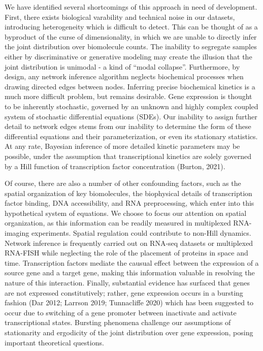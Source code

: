 \documentclass{article}
\begin{document}
We have identified several shortcomings of this approach in need of development. First, there exists biological varability and technical noise in our datasets, introducing heterogeneity which is difficult to detect. This can be thought of as a byproduct of the curse of dimensionality, in which we are unable to directly infer the joint distribution over biomolecule counts. The inability to segregate samples either by discriminative or generative modeling may create the illusion that the joint distribution is unimodal - a kind of ``modal collapse''. Furthermore, by design, any network inference algorithm neglects biochemical processes when drawing directed edges between nodes. Inferring precise biochemical kinetics is a much more difficult problem, but remains desirable. Gene expression is thought to be inherently stochastic, governed by an unknown and highly complex coupled system of stochastic differential equations (SDEs). Our inability to assign further detail to network edges stems from our inability to determine the form of these differential equations and their parameterization, or even its stationary statistics. At any rate, Bayesian inference of more detailed kinetic parameters may be possible, under the assumption that transcriptional kinetics are solely governed by a Hill function of transcription factor concentration (Burton, 2021). 

Of course, there are also a number of other confounding factors, such as the spatial organization of key biomolecules, the biophysical details of transcription factor binding, DNA accessibility, and RNA preprocessing, which enter into this hypothetical system of equations. We choose to focus our attention on spatial organization, as this information can be readily measured in multiplexed RNA-imaging experiments. Spatial regulation could contribute to non-Hill dynamics.  Network inference is frequently carried out on RNA-seq datasets or multiplexed RNA-FISH while neglecting the role of the placement of proteins in space and time. Transcription factors mediate the causual effect between the expression of a source gene and a target gene, making this information valuable in resolving the nature of this interaction. Finally, substantial evidence has surfaced that genes are not expressed constitutively; rather, gene expression occurs in a bursting fashion (Dar 2012; Larrson 2019; Tunnacliffe 2020) which has been suggested to occur due to switching of a gene promoter between inactivate and activate transcriptional states. Bursting phenomena challenge our assumptions of stationarity and ergodicity of the joint distribution over gene expression, posing important theoretical questions.
\end{document}
